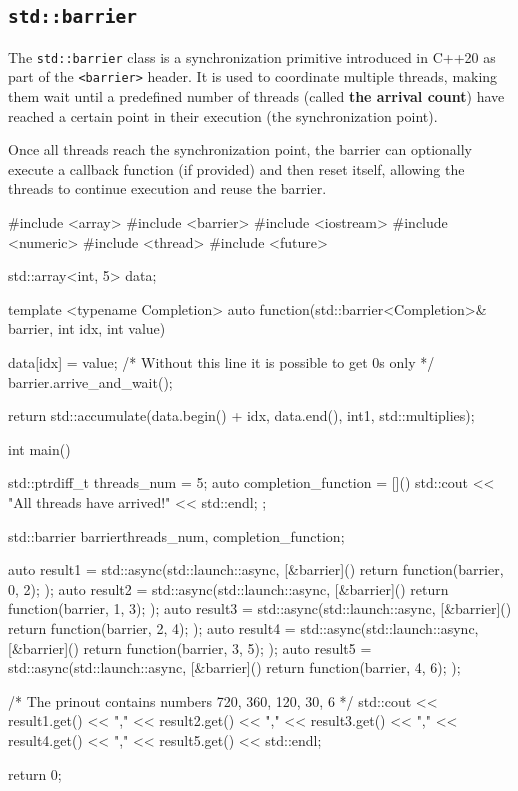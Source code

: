 \documentclass[../main]{subfiles}
\begin{document}
    \subsection{\texttt{std::barrier}}
   The \texttt{std::barrier} class is a synchronization primitive
introduced in C++20 as part of the \texttt{<barrier>} header.
It is used to coordinate multiple threads, making them wait until
a predefined number of threads (called \textbf{the arrival count})
have reached a certain point in their execution (the synchronization point).\newline

    Once all threads reach the synchronization point, the barrier can
optionally execute a callback function (if provided) and then reset itself,
allowing the threads to continue execution and reuse the barrier.
\begin{Code}
    #include <array>
    #include <barrier>
    #include <iostream>
    #include <numeric>
    #include <thread>
    #include <future>

    std::array<int, 5> data{};

    template <typename Completion>
    auto function(std::barrier<Completion>& barrier, int idx, int value)
    {
        data[idx] = value;
        /* Without this line it is possible to get 0s only */
        barrier.arrive_and_wait();

        return std::accumulate(data.begin() + idx, data.end(),
            int{1}, std::multiplies{});
    }

    int main()
    {
        std::ptrdiff_t threads_num = 5;
        auto completion_function = []()
        {
            std::cout << "All threads have arrived!" << std::endl;
        };

        std::barrier barrier{threads_num, completion_function};

        auto result1 = std::async(std::launch::async,
            [&barrier]() { return function(barrier, 0, 2); });
        auto result2 = std::async(std::launch::async,
            [&barrier]() { return function(barrier, 1, 3); });
        auto result3 = std::async(std::launch::async,
            [&barrier]() { return function(barrier, 2, 4); });
        auto result4 = std::async(std::launch::async,
            [&barrier]() { return function(barrier, 3, 5); });
        auto result5 = std::async(std::launch::async,
            [&barrier]() { return function(barrier, 4, 6); });

        /* The prinout contains numbers 720, 360, 120, 30, 6 */
        std::cout << result1.get() << ","
                  << result2.get() << ","
                  << result3.get() << ","
                  << result4.get() << ","
                  << result5.get() << std::endl;

        return 0;
    }
\end{Code}
\end{document}
